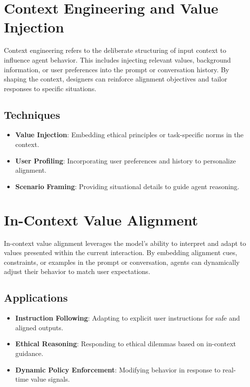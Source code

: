 \begin{TNtwocol}
\section{Context Engineering and Value Injection}
Context engineering refers to the deliberate structuring of input context to influence agent behavior. This includes injecting relevant values, background information, or user preferences into the prompt or conversation history. By shaping the context, designers can reinforce alignment objectives and tailor responses to specific situations.

\subsection{Techniques}
\begin{itemize}
    \item \textbf{Value Injection}: Embedding ethical principles or task-specific norms in the context.
    \item \textbf{User Profiling}: Incorporating user preferences and history to personalize alignment.
    \item \textbf{Scenario Framing}: Providing situational details to guide agent reasoning.
\end{itemize}

\section{In-Context Value Alignment}
In-context value alignment leverages the model’s ability to interpret and adapt to values presented within the current interaction. By embedding alignment cues, constraints, or examples in the prompt or conversation, agents can dynamically adjust their behavior to match user expectations.

\subsection{Applications}
\begin{itemize}
    \item \textbf{Instruction Following}: Adapting to explicit user instructions for safe and aligned outputs.
    \item \textbf{Ethical Reasoning}: Responding to ethical dilemmas based on in-context guidance.
    \item \textbf{Dynamic Policy Enforcement}: Modifying behavior in response to real-time value signals.
\end{itemize}


\end{TNtwocol}
